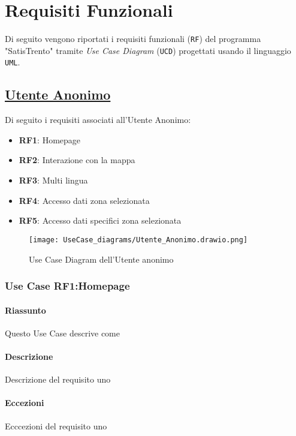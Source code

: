 \chapter{Requisiti Funzionali}
\label{ch:requisitiFunzionali}

Di seguito vengono riportati i requisiti funzionali (\texttt{RF}) del programma "SatisTrento" tramite \textit{Use Case Diagram} (\texttt{UCD}) progettati usando il linguaggio \texttt{UML}.

\section{\underline{Utente Anonimo}}
    Di seguito i requisiti associati all'Utente Anonimo:
    \begin{itemize}
        \item \textbf{RF1}: Homepage
        \item \textbf{RF2}: Interazione con la mappa
        \item \textbf{RF3}: Multi lingua
        \item \textbf{RF4}: Accesso dati zona selezionata
        \item \textbf{RF5}: Accesso dati specifici zona selezionata
    \end{itemize}
    \begin{figure}[H]
        \centering
        \texttt{[image: UseCase\_diagrams/Utente\_Anonimo.drawio.png]}
        \caption{Use Case Diagram dell'Utente anonimo}
    \end{figure}
    \subsection{Use Case {RF1}:Homepage}
        \subsubsection{Riassunto}           %
            Questo Use Case descrive come   %
        \subsubsection{Descrizione}
            Descrizione del requisito uno
        \subsubsection{Eccezioni}
            Ecccezioni del requisito uno
